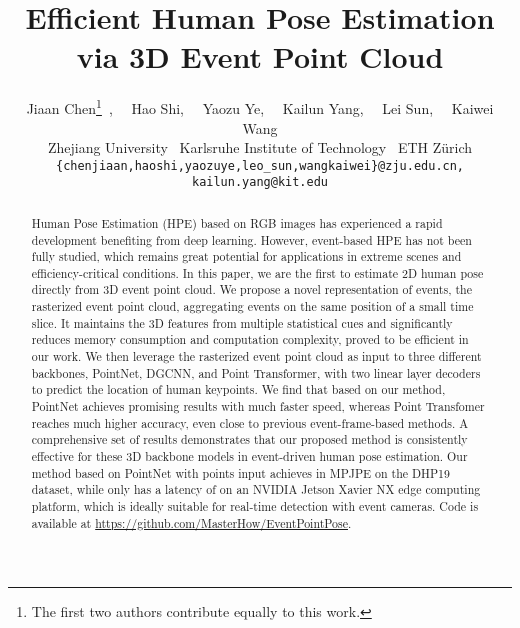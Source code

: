 \documentclass[10pt,twocolumn,letterpaper]{article}
\begin{document}
\title{Efficient Human Pose Estimation via 3D Event Point Cloud}
\author{Jiaan Chen\thanks{The first two authors contribute equally to this work.}\, ,
~~Hao Shi,
~~Yaozu Ye,
~~Kailun Yang,
~~Lei Sun,
~~Kaiwei Wang\\
\normalsize
Zhejiang University
\normalsize
~Karlsruhe Institute of Technology
\normalsize
~ETH Z\"urich\\
{\tt\small \{chenjiaan,haoshi,yaozuye,leo\_sun,wangkaiwei\}@zju.edu.cn, kailun.yang@kit.edu}
}

\maketitle

\begin{abstract}
\vspace{-0.75em}
Human Pose Estimation (HPE) based on RGB images has experienced a rapid development benefiting from deep learning. However, event-based HPE has not been fully studied, which remains great potential for applications in extreme scenes and efficiency-critical conditions. In this paper, we are the first to estimate 2D human pose directly from 3D event point cloud. We propose a novel representation of events, the rasterized event point cloud, aggregating events on the same position of a small time slice. It maintains the 3D features from multiple statistical cues and significantly reduces memory consumption and computation complexity, proved to be efficient in our work. We then leverage the rasterized event point cloud as input to three different backbones, PointNet, DGCNN, and Point Transformer, with two linear layer decoders to predict the location of human keypoints. We find that based on our method, PointNet achieves promising results with much faster speed, whereas Point Transfomer reaches much higher accuracy, even close to previous event-frame-based methods. A comprehensive set of results demonstrates that our proposed method is consistently effective for these 3D backbone models in event-driven human pose estimation. Our method based on PointNet with  points input achieves  in MPJPE on the DHP19 dataset, while only has a latency of  on an NVIDIA Jetson Xavier NX edge computing platform, which is ideally suitable for real-time detection with event cameras. Code is available at \url{https://github.com/MasterHow/EventPointPose}.
\end{abstract}

\vspace{-1.75em}
\end{document}
